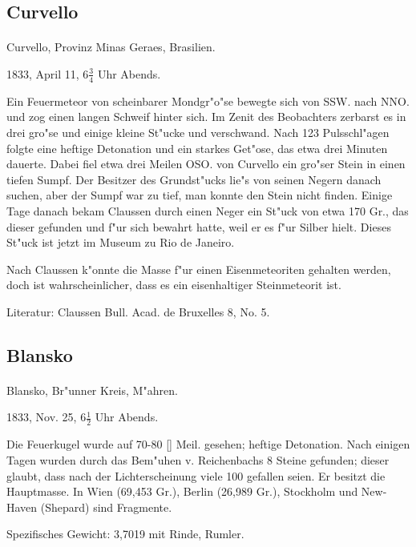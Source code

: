\documentclass[a4paper, 11pt, oneside]{article}
\begin{document}
\subsection{Curvello}
\normalsize
\paragraph{}
Curvello, Provinz Minas Geraes, Brasilien.

1833, April 11, $6\frac{3}{4}$ Uhr Abends.

Ein Feuermeteor von scheinbarer Mondgr"o"se bewegte sich von SSW. nach NNO. und zog einen langen Schweif hinter sich. Im Zenit des Beobachters zerbarst es in drei gro"se und einige kleine St"ucke und verschwand. Nach 123 Pulsschl"agen folgte eine heftige Detonation und ein starkes Get"ose, das etwa drei Minuten dauerte. Dabei fiel etwa drei Meilen OSO. von Curvello ein gro"ser Stein in einen tiefen Sumpf. Der Besitzer des Grundst"ucks lie"s von seinen Negern danach suchen, aber der Sumpf war zu tief, man konnte den Stein nicht finden. Einige Tage danach bekam Claussen durch einen Neger ein St"uck von etwa 170 Gr., das dieser gefunden und f"ur sich bewahrt hatte, weil er es f"ur Silber hielt. Dieses St"uck ist jetzt im Museum zu Rio de Janeiro.

Nach Claussen k"onnte die Masse f"ur einen Eisenmeteoriten gehalten werden, doch ist wahrscheinlicher, dass es ein eisenhaltiger Steinmeteorit ist.

\footnotesize
Literatur: Claussen Bull. Acad. de Bruxelles 8, No. 5.

\subsection{Blansko}
\normalsize
\paragraph{}
Blansko, Br"unner Kreis, M"ahren.

1833, Nov. 25, $6\frac{1}{2}$ Uhr Abends.

Die Feuerkugel wurde auf 70-80 [] Meil. gesehen; heftige Detonation. Nach einigen Tagen wurden durch das Bem"uhen v. Reichenbachs 8 Steine gefunden; dieser glaubt, dass nach der Lichterscheinung viele 100 gefallen seien. Er besitzt die Hauptmasse. In Wien (69,453 Gr.), Berlin (26,989 Gr.), Stockholm und New-Haven (Shepard) sind Fragmente.

Spezifisches Gewicht: 3,7019 mit Rinde, Rumler.
\end{document}
